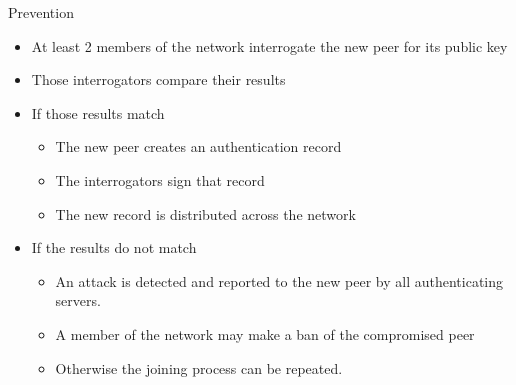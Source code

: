 \documentclass[11pt]{beamer}
\begin{document}
\begin{frame}{Prevention}

	\begin{itemize}
		\item  At least 2 members of the network interrogate the new peer for its public key
		\item  Those interrogators compare their results
		\item  If those results match
		\begin{itemize}
		
		    \item The new peer creates an authentication record
		    \item The interrogators sign that record
		    \item The new record is distributed across the network
		\end{itemize}
		
		
		\item  If the results do not match
		\begin{itemize}
		
		    \item An attack is detected and reported to the new peer by all authenticating servers.
		    \item A member of the network may make a ban of the compromised peer
		    \item Otherwise the joining process can be repeated.
		\end{itemize}
		
	\end{itemize}


\end{frame}
\end{document}

